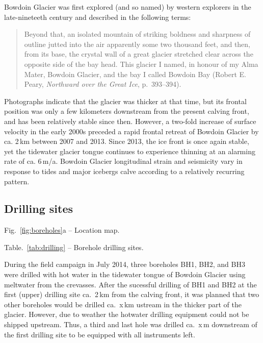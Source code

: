 \documentclass[utf8]{article}
\begin{document}
    Bowdoin Glacier was first explored (and so named) by western explorers in
    the late-nineteeth century and described in the following terms:
    \begin{quote}
        Beyond that, an isolated mountain of striking boldness and sharpness of
        outline jutted into the air apparently some two thousand feet, and
        then, from its base, the crystal wall of a great glacier stretched
        clear across the opposite side of the bay head. This glacier I named,
        in honour of my Alma Mater, Bowdoin Glacier, and the bay I called
        Bowdoin Bay (Robert E. Peary, \emph{Northward over the Great Ice},
        p.~393--394).
    \end{quote}
    Photographs indicate that the glacier was thicker at that time, but its
    frontal position was only a few kilometers downstream from the present
    calving front, and has been relatively stable since then. However, a
    two-fold increase of surface velocity in the early 2000s preceded a rapid
    frontal retreat of Bowdoin Glacier by ca. 2\,km between 2007 and 2013.
    Since 2013, the ice front is once again stable, yet the tidewater glacier
    tongue continues to experience thinning at an alarming rate of ca. 6\,m/a.
    Bowdoin Glacier longitudinal strain and seismicity vary in response to
    tides and major icebergs calve according to a relatively recurring pattern.


\subsection{Drilling sites}

    Fig.~\ref{fig:boreholes}a -- Location map.

    Table.~\ref{tab:drilling} -- Borehole drilling sites.

    During the field campaign in July 2014, three boreholes BH1, BH2, and BH3
    were drilled with hot water in the tidewater tongue of Bowdoin Glacier
    using meltwater from the crevasses.  After the sucessful drilling of BH1
    and BH2 at the first (upper) drilling site ca.~2\,km from the calving
    front, it was planned that two other boreholes would be drilled ca.~x\,km
    ustream in the thicker part of the glacier. However, due to weather the
    hotwater drilling equipment could not be shipped upstream. Thus, a third
    and last hole was drilled ca.~x\,m downstream of the first drilling site
    to be equipped with all instruments left.
\end{document}
